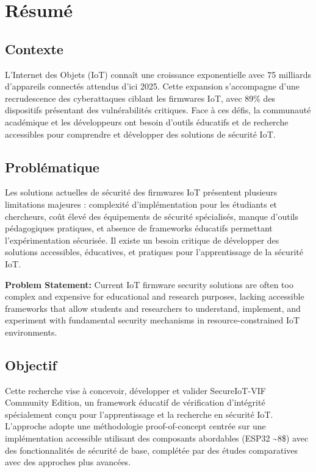 
\chapter*{Résumé}

\section*{Contexte}

L'Internet des Objets (IoT) connaît une croissance exponentielle avec 75 milliards d'appareils connectés attendus d'ici 2025. Cette expansion s'accompagne d'une recrudescence des cyberattaques ciblant les firmwares IoT, avec 89\% des dispositifs présentant des vulnérabilités critiques. Face à ces défis, la communauté académique et les développeurs ont besoin d'outils éducatifs et de recherche accessibles pour comprendre et développer des solutions de sécurité IoT.

\section*{Problématique}

Les solutions actuelles de sécurité des firmwares IoT présentent plusieurs limitations majeures : complexité d'implémentation pour les étudiants et chercheurs, coût élevé des équipements de sécurité spécialisés, manque d'outils pédagogiques pratiques, et absence de frameworks éducatifs permettant l'expérimentation sécurisée. Il existe un besoin critique de développer des solutions accessibles, éducatives, et pratiques pour l'apprentissage de la sécurité IoT.

\textbf{Problem Statement:} Current IoT firmware security solutions are often too complex and expensive for educational and research purposes, lacking accessible frameworks that allow students and researchers to understand, implement, and experiment with fundamental security mechanisms in resource-constrained IoT environments.

\section*{Objectif}

Cette recherche vise à concevoir, développer et valider SecureIoT-VIF Community Edition, un framework éducatif de vérification d'intégrité spécialement conçu pour l'apprentissage et la recherche en sécurité IoT. L'approche adopte une méthodologie proof-of-concept centrée sur une implémentation accessible utilisant des composants abordables (ESP32 \textasciitilde 8\$) avec des fonctionnalités de sécurité de base, complétée par des études comparatives avec des approches plus avancées.

